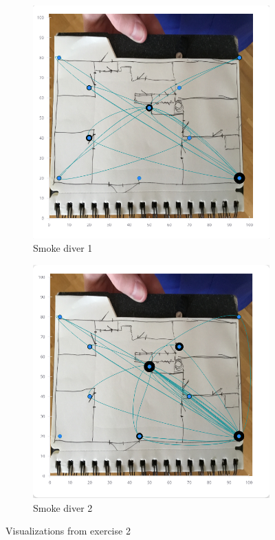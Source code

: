 \documentclass[../Main/thesis.tex]{subfiles}
\begin{document}
\begin{figure}[H]
	\centering
	\begin{subfigure}{0.7\textwidth}
		\includegraphics[width=\textwidth]{../fig/eval_2_remi}
		\caption{Smoke diver 1}
		\label{fig:eval-visualization-2-1-app}
	\end{subfigure}
	\begin{subfigure}{0.7\textwidth}
		\includegraphics[width=\textwidth]{../fig/eval_2_fredrik}
		\caption{Smoke diver 2}
		\label{fig:eval-visualization-2-2-app}
	\end{subfigure}
	\caption{Visualizations from exercise 2}
	\label{fig:eval-visualization-2-app}
\end{figure}
\end{document}
